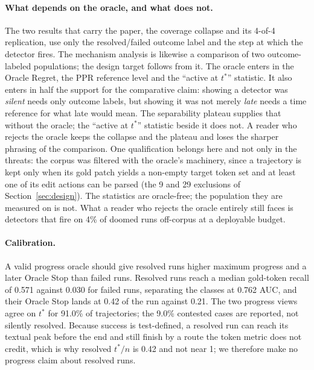 \documentclass[sigconf,screen]{acmart}
\begin{document}
\paragraph{What depends on the oracle, and what does not.} The two results that carry the paper,
the coverage collapse and its 4-of-4 replication, use only the resolved/failed outcome label and the
step at which the detector fires. The mechanism analysis is likewise a comparison of two
outcome-labeled populations; the design target follows from it. The oracle enters in
the Oracle Regret, the PPR reference level and the ``active at $t^{*}$'' statistic. It also enters
in half the support for the comparative claim: showing a detector
was \emph{silent} needs only outcome labels, but showing it was not merely \emph{late} needs a time
reference for what late would mean. The separability plateau supplies that without the oracle; the
``active at $t^{*}$'' statistic beside it does not. A reader who rejects the oracle keeps the
collapse and the plateau and loses the sharper phrasing of the comparison. One
qualification belongs here and not only in the threats: the corpus was filtered with the oracle's
machinery, since a trajectory is kept only when its gold patch yields a non-empty target token set
and at least one of its edit actions can be parsed (the 9 and 29 exclusions of
Section~\ref{sec:design}).
The statistics are oracle-free; the population they are measured on is not. What a reader who
rejects the oracle entirely still faces is detectors that fire on 4\% of doomed runs off-corpus at a
deployable budget.

\paragraph{Calibration.} A valid progress oracle should give resolved runs higher maximum progress
and a later Oracle Stop than failed runs. Resolved runs reach a median gold-token recall of 0.571
against 0.030 for failed runs, separating the classes at 0.762 AUC, and their Oracle Stop lands at
0.42 of the run against 0.21. The two progress views agree on $t^{*}$ for 91.0\% of trajectories;
the 9.0\% contested cases are reported, not silently resolved. Because success is test-defined, a
resolved run can reach its textual peak before the end and still finish by a route the token metric
does not credit, which is why resolved $t^{*}/n$ is 0.42 and not near 1; we therefore make no
progress claim about resolved runs.
\end{document}
